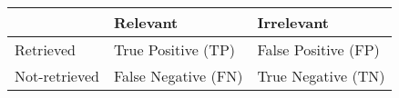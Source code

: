 
{
\sffamily


\begin{tabular}{ | l | l | l | }
    \hline
     & Relevant & Irrelevant  \\ \hline
   Retrieved & True Positive (TP) & False Positive (FP) \\ \hline
    Not-retrieved & False Negative (FN) & True Negative (TN) \\ \hline
       
\end{tabular}
}
